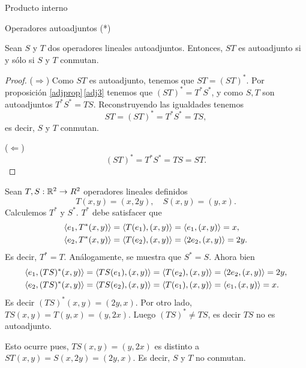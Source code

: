 \begin{chapter}{Producto interno}
\begin{section}{Operadores autoadjuntos (*)}
        \begin{proposicion} Sean $S$ y $T$ dos operadores lineales autoadjuntos. Entonces, $ST$  es autoadjunto si y sólo  si $S$ y $T$ conmutan. 
        \end{proposicion}
        \begin{proof}
            ($\Rightarrow$) Como $ST$ es autoadjunto, tenemos que $ST = (ST)^*$. Por proposición \ref{adjprop}\,\ref{adj3} tenemos que  $(ST)^* = T^*S^*$, y  como $S,T$ son autoadjuntos $T^*S^* = TS$. 
            Reconstruyendo las igualdades tenemos
            $$
            ST = (ST)^* = T^*S^*= TS,
            $$
            es decir, $S$ y $T$ conmutan.
            
            ($\Leftarrow$)  
            $$
            (ST)^* = T^*S^* = TS = ST.
            $$
        \end{proof}
        
        
        \begin{ejemplo*}
            Sean $T,S: \mathbb R^2 \to R^2$ operadores lineales definidos
            $$
            T(x,y) = (x,2y),\quad S(x,y) = (y,x).
            $$
            Calculemos $T^*$ y $S^*$. $T^*$ debe satisfacer  que 
            \begin{align*}
                \langle e_1, T^*(x,y)\rangle &= \langle T(e_1),(x,y) \rangle = \langle e_1, (x,y) \rangle = x, \\
                \langle e_2, T^*(x,y)\rangle &= \langle T(e_2),(x,y) \rangle = \langle 2e_2, (x,y) \rangle = 2y.
            \end{align*}
            Es decir, $T^* = T$. Análogamente, se muestra que $S^* = S$. Ahora bien
            \begin{align*}
            \langle e_1, (TS)^*(x,y)\rangle &= \langle TS(e_1),(x,y) \rangle = \langle T(e_2), (x,y) \rangle = \langle 2e_2, (x,y) \rangle = 2y, \\
            \langle e_2, (TS)^*(x,y)\rangle &= \langle TS(e_2),(x,y) \rangle = \langle T(e_1), (x,y) \rangle = \langle e_1, (x,y) \rangle = x.
            \end{align*}
            Es decir $(TS)^*(x,y) = (2y,x)$. Por otro lado,  $TS(x,y) = T(y,x) = (y,2x)$. Luego $(TS)^* \ne TS$, es decir $TS$ no es autoadjunto. 
            
            Esto ocurre pues, $TS(x,y) = (y,2x)$ es distinto a  $ST(x,y) = S(x,2y)= (2y,x)$. Es decir, $S$ y $T$ no conmutan.
        \end{ejemplo*}


\end{section}
\end{chapter}
